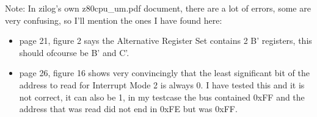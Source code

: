\documentclass[oneside,a4paper]{book}
\begin{document}
Note: In zilog's own z80cpu\_um.pdf document, there are a lot of errors, some are very confusing, so I'll mention the ones I have found here:

\begin{itemize}

	\item
	page 21, figure 2 says the Alternative Register Set contains 2 B' registers, this should ofcourse be B' and C'.  

	\item
	page 26, figure 16 shows very convincingly that the least significant bit of the address to read for Interrupt Mode 2 is always 0. I have tested this and it is not correct, it can also be 1, in my testcase the bus contained 0xFF and the address that was read did not end in 0xFE but was 0xFF.
  
\end{itemize}
\end{document}
